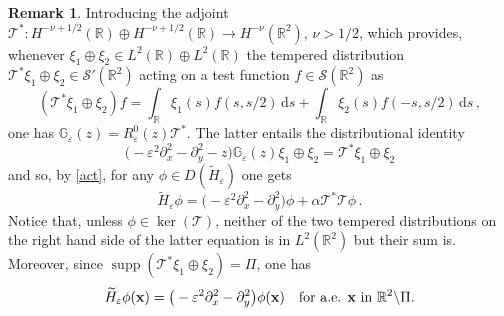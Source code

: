 \documentclass[a4paper,11pt,reqno]{amsart}
\theoremstyle{definition}
\newtheorem{remark}[theorem]{Remark}
\numberwithin{equation}{section}
\newcommand{\RE}{\mathbb R}
\newcommand{\Gb}{\mathbb G}
\newcommand{\Tau}{\mathcal{T}}
\renewcommand{\SS}{\mathcal S}
\newcommand{\ve}{\varepsilon}
\renewcommand{\d}{\mathrm{d}}
\newcommand{\x}{{\bf  x}}
\newcommand{\supp}{\operatorname{supp}}
\newcommand{\alve}{\ve}
\newcommand{\be}{\begin{equation}}
\newcommand{\ee}{\end{equation}}
\begin{document}
\begin{remark}\label{temp} Introducing the adjoint 
$\Tau^{*}:H^{-\nu+1/2}(\RE)\oplus H^{-\nu+1/2}(\RE)\to H^{-\nu}(\RE^{2})$, $\nu>1/2$, which provides, whenever $\xi_{1}\oplus\xi_{2}\in L^{2}(\RE)\oplus L^{2}(\RE)$ the tempered distribution $\Tau^{*}\xi_{1}\oplus\xi_{2}\in \SS'(\RE^{2})$ acting on a test function $f\in\SS(\RE^{2})$ as
\[
(\Tau^{*}\xi_{1}\oplus\xi_{2})f=\int_{\RE}\xi_{1}(s)f(s,s/2)\,\d s+\int_{\RE}\xi_{2}(s)f(-s,s/2)\,\d s\,,
\]
one has $\Gb_{\ve}(z)=R^{0}_{ \ve}(z)\Tau^{*}$. The latter entails the distributional identity 
\be\label{d-id-1}
\big( -\ve^2 \partial^2_{x}-\partial^2_{y}-z\big)\Gb_{\ve}(z)\xi_{1}\oplus\xi_{2}=\Tau^{*}\xi_{1}\oplus\xi_{2}
\ee
and so, by \eqref{act}, for any $\phi \in D(\widetilde H_{\alve})$ one gets
\be\label{act2}
\widetilde H_{\alve}\phi=\big( -\ve^2 \partial^2_{x}-\partial^2_{y}\big)\phi+\alpha  \Tau^{*}\Tau\phi\,.
\ee
Notice that, unless $\phi\in\ker(\Tau)$, neither of the two tempered distributions on the right hand side of the latter equation is in $L^{2}(\RE^{2})$ but their sum is. Moreover, since $\supp(\Tau^{*}\xi_{1}\oplus\xi_{2})=\Pi$, 
 one has
 \[
 \widetilde H_{\alve}\phi(\x)=\big( -\ve^2 \partial^2_{x}-\partial^2_{y}\big)\phi(\x)\quad\text{for a.e. $\x$ in $\RE^{2}\backslash\Pi$.}
\]
\end{remark}
\end{document}
